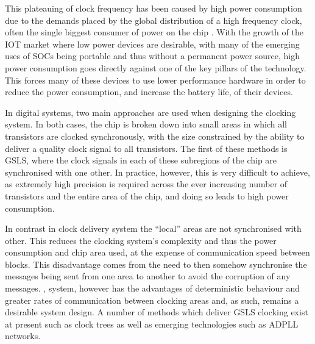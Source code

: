 This plateauing of clock frequency has been caused by high power consumption due to the demands placed by the global distribution of a high frequency clock, often the single biggest consumer of power on the chip \cite{tiwari1998reducing}.
With the growth of the \ac{IOT} market where low power devices are desirable, with many of the emerging uses of \acp{SOC} being portable and thus without a permanent power source, high power consumption goes directly against one of the key pillars of the technology. This forces many of these devices to use lower performance hardware in order to reduce the power consumption, and increase the battery life, of their devices.

In digital systems, two main approaches are used when designing the clocking system. In both cases, the chip is broken down into small areas in which all transistors are clocked synchronously, with the size constrained by the ability to deliver a quality clock signal to all transistors. The first of these methods is \ac{GSLS}, where the clock signals in each of these subregions of the chip are synchronised with one other. In practice, however, this is very difficult to achieve, as extremely high precision is required across the ever increasing number of transistors and the entire area of the chip, and doing so leads to high power consumption.

In contrast in  clock delivery system the ``local'' areas are not synchronised with other. This reduces the clocking system's complexity and thus the power consumption and chip area used, at the expense of communication speed between blocks. This disadvantage comes from the need to then somehow synchronise the messages being sent from one area to another to avoid the corruption of any messages.
, system, however has the advantages of deterministic behaviour and greater rates of communication between clocking areas and, as such, remains a desirable system design. A number of methods which deliver \ac{GSLS} clocking exist at present such as clock trees as well as emerging technologies such as ADPLL networks.

